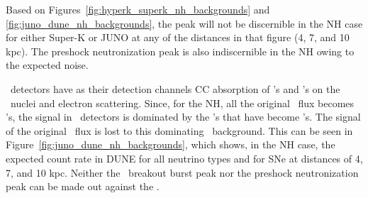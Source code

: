 Based on Figures~\ref{fig:hyperk_superk_nh_backgrounds} and \ref{fig:juno_dune_nh_backgrounds}, the peak
will not be discernible in the NH case for either Super-K or JUNO at
any of the distances in that figure (4, 7, and 10 kpc).  The
preshock neutronization peak is also indiscernible in the
NH owing to the expected noise.





\ detectors have as their detection channels CC
absorption of \nue's and \anue's on the \ nuclei and electron
scattering.  Since, for the NH, all the original \nue\ flux becomes
\nuxpart's, the signal in \ detectors is dominated by the \nuxpart's that
have become \nue's.  The signal of the original \nue\ flux is lost to
this dominating \nuxpart\ background.  This can be seen in
Figure~\ref{fig:juno_dune_nh_backgrounds}, which shows, in the NH
case, the expected count rate
in DUNE for all neutrino types and 
for SNe at distances of 4, 7, and 10 kpc.  
Neither the \nue\ breakout burst peak nor the preshock
neutronization peak can be made out against the
\backgrounds.  

